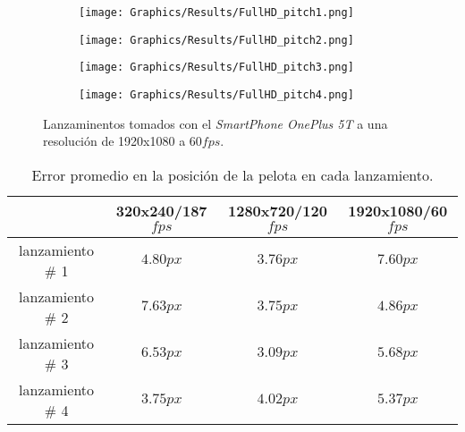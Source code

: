 \begin{figure}[!h]
    \centering
    \begin{subfigure}[b]{0.48\linewidth}
        \texttt{[image: Graphics/Results/FullHD\_pitch1.png]}
    \end{subfigure}
    \begin{subfigure}[b]{0.48\linewidth}
        \texttt{[image: Graphics/Results/FullHD\_pitch2.png]}
    \end{subfigure}
    \begin{subfigure}[b]{0.48\linewidth}
        \texttt{[image: Graphics/Results/FullHD\_pitch3.png]}
    \end{subfigure}
    \begin{subfigure}[b]{0.48\linewidth}
        \texttt{[image: Graphics/Results/FullHD\_pitch4.png]}
    \end{subfigure}
	\caption{Lanzaminentos tomados con el \textit{SmartPhone OnePlus 5T} a una resolución de 1920x1080 a 60$fps$.}
	\label{fig:PitchesFullHD}
\end{figure}

\begin{table}[!h]
    \centering
    \begin{tabular}{cccc}
        & 320x240/187$fps$ & 1280x720/120$fps$ & 1920x1080/60$fps$\\\hline
        lanzamiento \# 1 & $4.80px$ & $3.76px$ & $7.60px$\\\hline
        lanzamiento \# 2 & $7.63px$ & $3.75px$ & $4.86px$\\\hline
        lanzamiento \# 3 & $6.53px$ & $3.09px$ & $5.68px$\\\hline
        lanzamiento \# 4 & $3.75px$ & $4.02px$ & $5.37px$
    \end{tabular}
    \caption{Error promedio en la posición de la pelota en cada lanzamiento.}
    \label{table:Errors}
\end{table}
